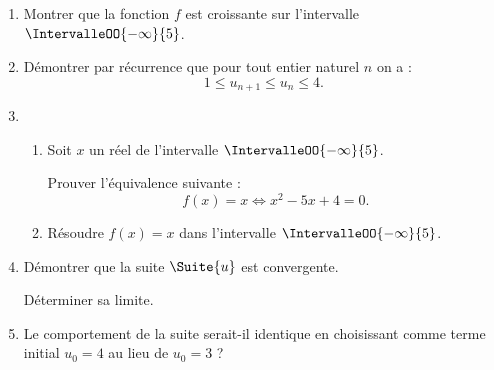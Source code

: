 \begin{enumerate}
	\item Montrer que la fonction $f$ est croissante sur l'intervalle $\IntervalleOO{-\infty}{5}$.
	\item Démontrer par récurrence que pour tout entier naturel $n$ on a : \[ 1 \leqslant u_{n+1} \leqslant u_{n} \leqslant 4. \]
	\item 
	\begin{enumerate}
		\item Soit $x$ un réel de l'intervalle $\IntervalleOO{-\infty}{5}$.
		
		Prouver l'équivalence suivante : \[ f(x)=x \Leftrightarrow x^{2}-5 x+4=0. \]
		\item Résoudre $f (x) = x$ dans l’intervalle $\IntervalleOO{-\infty}{5}$.
	\end{enumerate}
	\item Démontrer que la suite $\Suite{u}$ est convergente.
	
	Déterminer sa limite.
	\item Le comportement de la suite serait-il identique en choisissant comme terme initial $u_0 = 4$ au lieu de $u_0 = 3$ ?
\end{enumerate}